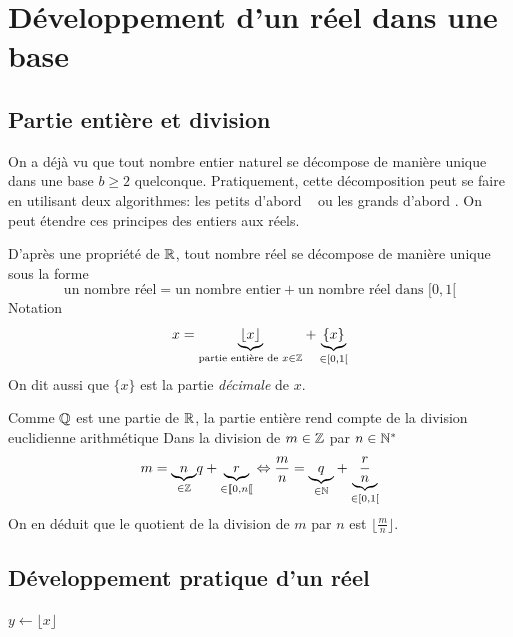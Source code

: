 \section{Développement d'un réel dans une base}
\subsection{Partie entière et division}
On a déjà vu que tout nombre entier naturel se décompose de manière unique dans une base $b\geq2$ quelconque. Pratiquement, cette décomposition peut se faire en utilisant deux algorithmes: \og les petits d'abord \fg~ ou \og les grands d'abord \fg. On peut étendre ces principes des entiers aux réels.

D'après une propriété de $\mathbb{R}$, tout nombre réel se décompose de manière unique sous la forme
\begin{displaymath}
  \text{un nombre réel} = \text{un nombre entier} + \text{un nombre réel dans $[0,1[$}
\end{displaymath}
Notation
\begin{displaymath}
  x = \underset{\text{partie entière de } x\in \mathbb{Z} }{\underbrace{\lfloor x \rfloor}} + \underset{\in [0,1[ }{\underbrace{\{ x \}}}
\end{displaymath}
On dit aussi que $\{x\}$ est la partie \emph{décimale} de $x$.

Comme $\mathbb{Q}$ est une partie de $\mathbb{R}$, la partie entière rend compte de la division euclidienne arithmétique\newline
Dans la division de $m\in \mathbb{Z}$ par $n\in \mathbb{N}^*$ 
\begin{displaymath}
  m = \underset{\in \mathbb{Z}}{\underbrace{n}}q + \underset{\in \llbracket 0, n\llbracket}{\underbrace{r}}
  \Leftrightarrow \frac{m}{n} = \underset{\in \mathbb{N}}{\underbrace{q}} + \underset{\in [0,1[}{\underbrace{\frac{r}{n}}} 
\end{displaymath}
On en déduit que le quotient de la division de $m$ par $n$ est $\lfloor \frac{m}{n} \rfloor$.
\subsection{Développement pratique d'un réel}
\begin{algorithm}
  $y\longleftarrow \lfloor x \rfloor$\;
  \caption{\`A gauche: les petits d'abord.}
  \label{nbbin_1}
\end{algorithm}

